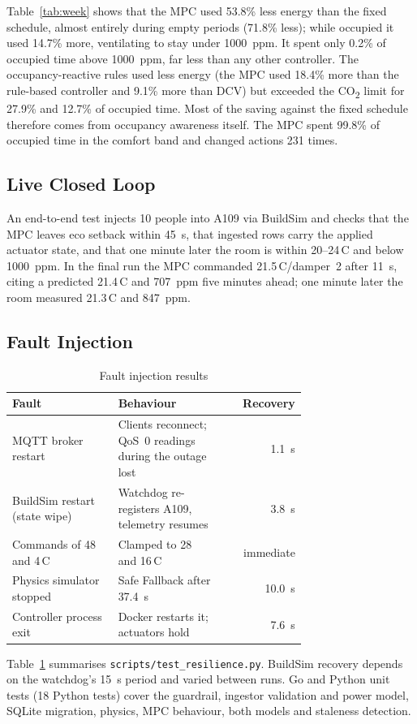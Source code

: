 \documentclass[conference,10pt]{IEEEtran}
\newcommand{\cotwo}{CO\textsubscript{2}}
\newcommand{\degC}{\,\textdegree{}C}
\begin{document}
Table~\ref{tab:week} shows that the MPC used 53.8\% less energy than the fixed schedule, almost entirely during empty periods (71.8\% less); while occupied it used 14.7\% more, ventilating to stay under 1000~ppm. It spent only 0.2\% of occupied time above 1000~ppm, far less than any other controller. The occupancy-reactive rules used less energy (the MPC used 18.4\% more than the rule-based controller and 9.1\% more than DCV) but exceeded the \cotwo{} limit for 27.9\% and 12.7\% of occupied time. Most of the saving against the fixed schedule therefore comes from occupancy awareness itself. The MPC spent 99.8\% of occupied time in the comfort band and changed actions 231 times.

\subsection{Live Closed Loop}
An end-to-end test injects 10 people into A109 via BuildSim and checks that the MPC leaves eco setback within 45~s, that ingested rows carry the applied actuator state, and that one minute later the room is within 20--24\degC{} and below 1000~ppm. In the final run the MPC commanded 21.5\degC{}/damper~2 after 11~s, citing a predicted 21.4\degC{} and 707~ppm five minutes ahead; one minute later the room measured 21.3\degC{} and 847~ppm.

\subsection{Fault Injection}
\begin{table}[t]
\caption{Fault injection results}
\label{tab:faults}
\centering
\begin{tabular}{@{}p{0.36\linewidth}p{0.36\linewidth}r@{}}
\toprule
Fault & Behaviour & Recovery \\ \midrule
MQTT broker restart & Clients reconnect; QoS~0 readings during the outage lost & 1.1~s \\
BuildSim restart (state wipe) & Watchdog re-registers A109, telemetry resumes & 3.8~s \\
Commands of 48 and 4\degC & Clamped to 28 and 16\degC & immediate \\
Physics simulator stopped & Safe Fallback after 37.4~s & 10.0~s \\
Controller process exit & Docker restarts it; actuators hold & 7.6~s \\ \bottomrule
\end{tabular}
\end{table}
Table~\ref{tab:faults} summarises \texttt{scripts/test\_resilience.py}. BuildSim recovery depends on the watchdog's 15~s period and varied between runs. Go and Python unit tests (18 Python tests) cover the guardrail, ingestor validation and power model, SQLite migration, physics, MPC behaviour, both models and staleness detection.
\end{document}
